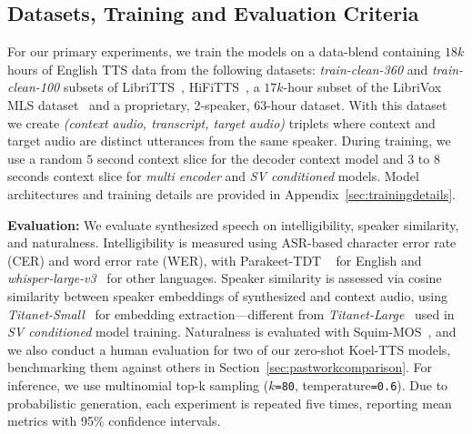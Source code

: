 
\subsection{Datasets, Training and Evaluation Criteria}
\label{sec:datasets}

For our primary experiments, we train the models on a data-blend containing $18k$ hours of English TTS data from the following datasets: \emph{train-clean-360} and \emph{train-clean-100} subsets of LibriTTS~\cite{zen2019libritts}, HiFiTTS~\cite{bakhturina21_interspeech}, a $17k$-hour subset of the LibriVox MLS dataset~\cite{pratap20_interspeech} and a proprietary, 2-speaker, 63-hour dataset. 
With this dataset we create \textit{(context audio, transcript, target audio)} triplets where context and target audio are distinct utterances from the same speaker. During training, we use a random $5$ second context slice for the decoder context model and $3$ to $8$ seconds context slice for \textit{multi encoder} and \textit{SV conditioned} models. Model architectures and training details are provided in Appendix~\ref{sec:trainingdetails}.



\textbf{Evaluation:} We evaluate synthesized speech on intelligibility, speaker similarity, and naturalness. Intelligibility is measured using ASR-based character error rate (CER) and word error rate (WER), with Parakeet-TDT ~\cite{xu2023efficient} for English and \textit{whisper-large-v3}~\cite{radford2022whisper} for other languages. Speaker similarity is assessed via cosine similarity between speaker embeddings of synthesized and context audio, using \textit{Titanet-Small}~\cite{koluguri2022titanet} for embedding extraction—different from \textit{Titanet-Large}~\cite{koluguri2022titanetlarge} used in \textit{SV conditioned} model training. Naturalness is evaluated with Squim-MOS~\cite{kumar2023torchaudio}, and we also conduct a human evaluation for two of our zero-shot Koel-TTS models, benchmarking them against others in Section~\ref{sec:pastworkcomparison}.
For inference, we use multinomial top-k sampling ($k$\texttt{=80}, temperature\texttt{=0.6}). Due to probabilistic generation, each experiment is repeated five times, reporting mean metrics with 95\% confidence intervals.

